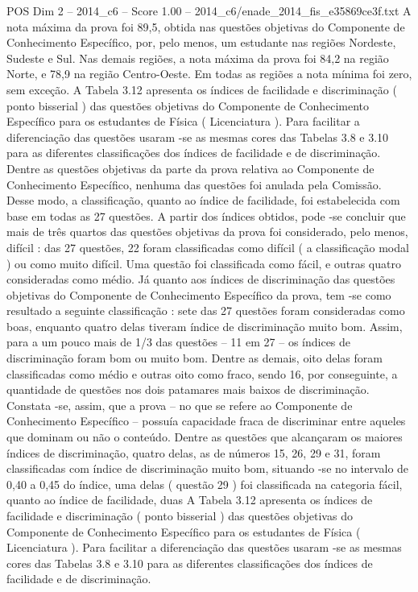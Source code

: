 \begin{textsample}{POS Dim 2 – 2014\_c6 – Score 1.00 – 2014\_c6/enade\_2014\_fis\_e35869ce3f.txt}
A nota máxima da prova foi 89,5, obtida nas questões objetivas do Componente de Conhecimento Específico, por, pelo menos, um estudante nas regiões Nordeste, Sudeste e Sul.
Nas demais regiões, a nota máxima da prova foi 84,2 na região Norte, e 78,9 na região Centro-Oeste.
Em todas as regiões a nota mínima foi zero, sem exceção.
A Tabela 3.12 apresenta os índices de facilidade e discriminação ( ponto bisserial ) das questões objetivas do Componente de Conhecimento Específico para os estudantes de Física ( Licenciatura ).
Para facilitar a diferenciação das questões usaram -se as mesmas cores das Tabelas 3.8 e 3.10 para as diferentes classificações dos índices de facilidade e de discriminação.
Dentre as questões objetivas da parte da prova relativa ao Componente de Conhecimento Específico, nenhuma das questões foi anulada pela Comissão.
Desse modo, a classificação, quanto ao índice de facilidade, foi estabelecida com base em todas as 27 questões.
A partir dos índices obtidos, pode -se concluir que mais de três quartos das questões objetivas da prova foi considerado, pelo menos, difícil : das 27 questões, 22 foram classificadas como difícil ( a classificação modal ) ou como muito difícil.
Uma questão foi classificada como fácil, e outras quatro consideradas como médio.
Já quanto aos índices de discriminação das questões objetivas do Componente de Conhecimento Específico da prova, tem -se como resultado a seguinte classificação : sete das 27 questões foram consideradas como boas, enquanto quatro delas tiveram índice de discriminação muito bom.
Assim, para a um pouco mais de 1/3 das questões – 11 em 27 – os índices de discriminação foram bom ou muito bom.
Dentre as demais, oito delas foram classificadas como médio e outras oito como fraco, sendo 16, por conseguinte, a quantidade de questões nos dois patamares mais baixos de discriminação.
Constata -se, assim, que a prova – no que se refere ao Componente de Conhecimento Específico – possuía capacidade fraca de discriminar entre aqueles que dominam ou não o conteúdo.
Dentre as questões que alcançaram os maiores índices de discriminação, quatro delas, as de números 15, 26, 29 e 31, foram classificadas com índice de discriminação muito bom, situando -se no intervalo de 0,40 a 0,45 do índice, uma delas ( questão 29 ) foi classificada na categoria fácil, quanto ao índice de facilidade, duas A Tabela 3.12 apresenta os índices de facilidade e discriminação ( ponto bisserial ) das questões objetivas do Componente de Conhecimento Específico para os estudantes de Física ( Licenciatura ).
Para facilitar a diferenciação das questões usaram -se as mesmas cores das Tabelas 3.8 e 3.10 para as diferentes classificações dos índices de facilidade e de discriminação.

\end{textsample}

